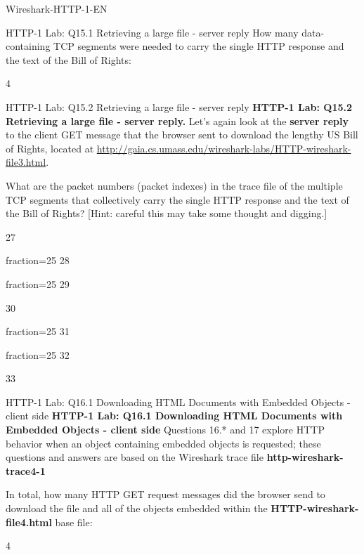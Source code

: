 \documentclass[a4paper]{article}
\begin{document}
\begin{quiz}{Wireshark-HTTP-1-EN}
\begin{shortanswer}[points=1]{HTTP-1 Lab: Q15.1 Retrieving a large file - server reply}
How many data-containing TCP segments were needed to carry the single HTTP response and the text of the Bill of Rights: 
\item 4
\end{shortanswer}

\begin{multi}[points=1,shuffle,multiple]{HTTP-1 Lab: Q15.2 Retrieving a large file - server reply}
\textbf{HTTP-1 Lab: Q15.2 Retrieving a large file - server reply.} Let's again look at the \textbf{server reply} to the client GET message that the browser sent to download the lengthy US Bill of Rights, located at \href{http://gaia.cs.umass.edu/wireshark-labs/HTTP-wireshark-file3.html}{http://gaia.cs.umass.edu/wireshark-labs/HTTP-wireshark-file3.html}. 

What are the packet numbers (packet indexes) in the trace file of the multiple TCP segments that collectively carry the single HTTP response and the text of the Bill of Rights? [Hint: careful this may take some thought and digging.] 
\item 27
\item[fraction=25] 28
\item[fraction=25] 29
\item 30
\item[fraction=25] 31
\item[fraction=25] 32
\item 33
\end{multi}

\begin{shortanswer}[points=1]{HTTP-1 Lab: Q16.1 Downloading HTML Documents with Embedded Objects - client side}
\textbf{HTTP-1 Lab: Q16.1 Downloading HTML Documents with Embedded Objects - client side} 
Questions 16.* and 17 explore HTTP behavior when an object containing embedded objects is requested; these questions and answers are based on the Wireshark trace file \textbf{http-wireshark-trace4-1}

In total, how many HTTP GET request messages did the browser send to download the file and all of the objects embedded within the \textbf{HTTP-wireshark-file4.html} base file:  
\item 4
\end{shortanswer}


\end{quiz}
\end{document}
